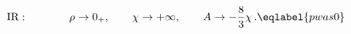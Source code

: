 \begin{equation}
{\rm IR:}\qquad\qquad \rho\to 0_+,\qquad \chi\to +\infty,\qquad
A\to -\frac 83 \chi\,.
\eqlabel{pwas0}
\end{equation}

